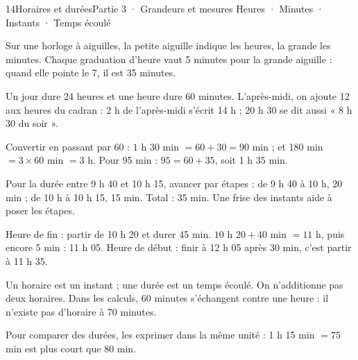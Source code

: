 \begin{ouverture}[grandeurs]{14}{Horaires et durées}{Partie 3 · Grandeurs et mesures}
{Heures · Minutes · Instants · Temps écoulé}
\end{ouverture}
\pagestyle{otMain}\essentiel\fontsize{11}{15}\selectfont
{}\label{cours-14-1}
\begin{definition}Sur une horloge à aiguilles, la petite aiguille indique les heures, la grande les minutes. Chaque graduation d’heure vaut 5 minutes pour la grande aiguille : quand elle pointe le 7, il est 35 minutes.\end{definition}
\label{fig-cours-14-1-cours-horloge}

\begin{propriete}Un jour dure 24 heures et une heure dure 60 minutes. L’après-midi, on ajoute 12 aux heures du cadran : 2 h de l’après-midi s’écrit 14 h ; 20 h 30 se dit aussi « 8 h 30 du soir ».\end{propriete}
\begin{savoirfaire}Convertir en passant par 60 : $1$ h $30$ min $=60+30=90$ min ; et 180 min $=3\times60$ min $=3$ h. Pour 95 min : $95=60+35$, soit 1 h 35 min.\end{savoirfaire}
\clearpage
{}\label{cours-14-2}
\begin{savoirfaire}Pour la durée entre 9 h 40 et 10 h 15, avancer par étapes : de 9 h 40 à 10 h, 20 min ; de 10 h à 10 h 15, 15 min. Total : 35 min. Une frise des instants aide à poser les étapes.\end{savoirfaire}
\begin{exemple}Heure de fin : partir de 10 h 20 et durer 45 min. $10$ h $20+40$ min $=11$ h, puis encore 5 min : 11 h 05. Heure de début : finir à 12 h 05 après 30 min, c’est partir à 11 h 35.\end{exemple}
\begin{attention}Un horaire est un instant ; une durée est un temps écoulé. On n’additionne pas deux horaires. Dans les calculs, 60 minutes s’échangent contre une heure : il n’existe pas d’horaire à 70 minutes.\end{attention}
\begin{propriete}Pour comparer des durées, les exprimer dans la même unité : 1 h 15 min $=75$ min est plus court que 80 min.\end{propriete}


